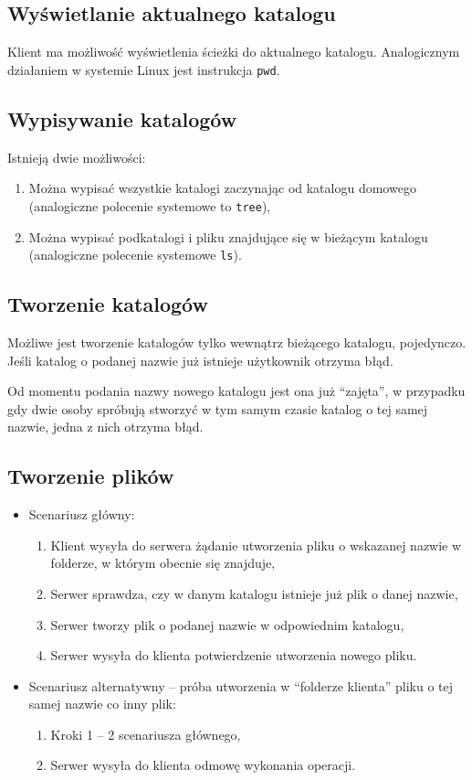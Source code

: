 \documentclass[10pt,a4paper]{article}
\newcommand{\quotes}[1]{``#1''}
\begin{document}
\subsection{Wyświetlanie aktualnego katalogu}
Klient ma możliwość wyświetlenia ścieżki do aktualnego katalogu. Analogicznym działaniem w systemie Linux jest instrukcja \texttt{pwd}.

\subsection{Wypisywanie katalogów}
\noindent Istnieją dwie możliwości:
\begin{enumerate}
    \item Można wypisać wszystkie katalogi zaczynając od katalogu domowego (analogiczne polecenie systemowe to \texttt{tree}),
    \item Można wypisać podkatalogi i pliku znajdujące się w bieżącym katalogu (analogiczne polecenie systemowe \texttt{ls}).
\end{enumerate}

\subsection{Tworzenie katalogów}
Możliwe jest tworzenie katalogów tylko wewnątrz bieżącego katalogu, pojedynczo. Jeśli katalog o podanej nazwie już istnieje użytkownik otrzyma błąd.

Od momentu podania nazwy nowego katalogu jest ona już \quotes{zajęta}, w przypadku gdy dwie osoby spróbują stworzyć w tym samym czasie katalog o tej samej nazwie, jedna z nich otrzyma błąd.

\subsection{Tworzenie plików}
\begin{itemize}
    \item Scenariusz główny:
    \begin{enumerate}
        \item Klient wysyła do serwera żądanie utworzenia pliku o wskazanej nazwie w folderze, w którym obecnie się znajduje,
        \item Serwer sprawdza, czy w danym katalogu istnieje już plik o danej nazwie,
        \item Serwer tworzy plik o podanej nazwie w odpowiednim katalogu,
        \item Serwer wysyła do klienta potwierdzenie utworzenia nowego pliku.
    \end{enumerate}
    
    \item Scenariusz alternatywny -- próba utworzenia w \quotes{folderze klienta} pliku o tej samej nazwie co inny plik:
    \begin{enumerate}
        \item Kroki 1 -- 2 scenariusza głównego,
        \item Serwer wysyła do klienta odmowę wykonania operacji.
    \end{enumerate}
\end{itemize}
\end{document}
